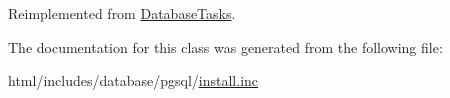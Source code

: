 Reimplemented from \hyperlink{classDatabaseTasks_ae582e57b43461aad87f47ad0d37b6c9a}{DatabaseTasks}.

The documentation for this class was generated from the following file:\begin{DoxyCompactItemize}
\item 
html/includes/database/pgsql/\hyperlink{database_2pgsql_2install_8inc}{install.inc}\end{DoxyCompactItemize}
